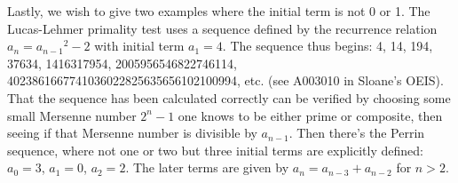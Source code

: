 \documentclass[12pt]{article}
\begin{document}
Lastly, we wish to give two examples where the initial term is not 0 or 1. The Lucas-Lehmer primality test uses a sequence defined by the recurrence relation $a_n = {a_{n - 1}}^2 - 2$ with initial term $a_1 = 4$. The sequence thus begins: 4, 14, 194, 37634, 1416317954, 2005956546822746114, 4023861667741036022825635656102100994, etc. (see A003010 in Sloane's OEIS). That the sequence has been calculated correctly can be verified by choosing some small Mersenne number $2^n - 1$ one knows to be either prime or composite, then seeing if that Mersenne number is divisible by $a_{n - 1}$. Then there's the Perrin sequence, where not one or two but three initial terms are explicitly defined: $a_0 = 3$, $a_1 = 0$, $a_2 = 2$. The later terms are given by $a_n = a_{n - 3} + a_{n - 2}$ for $n > 2$.
\end{document}
